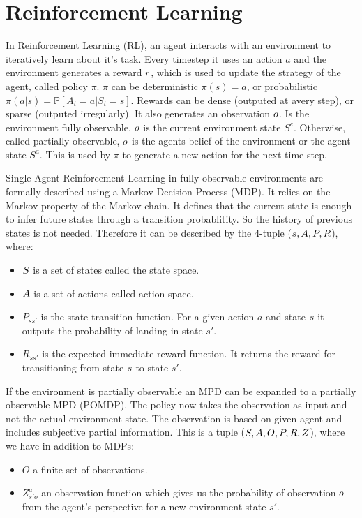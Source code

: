 \section{Reinforcement Learning}
In Reinforcement Learning (RL), an agent interacts with an environment to iteratively learn about it's task. Every timestep it uses an action $a$ and the environment generates a reward $r$, which is used to update the strategy of the agent, called policy $\pi$. $\pi$ can be deterministic $\pi(s) = a$, or probabilistic $\pi(a|s) = \mathbb{P}[A_t=a|S_t=s]$. Rewards can be dense (outputed at avery step), or sparse (outputed irregularly). It also generates an observation $o$. Is the environment fully observable, $o$ is the current environment state $S^e$. Otherwise, called partially observable, $o$ is the agents belief of the environment or the agent state $S^a$. This is used by $\pi$ to generate a new action for the next time-step. \par

Single-Agent Reinforcement Learning in fully observable environments are formally described using a Markov Decision Process (MDP). It relies on the Markov property of the Markov chain. It defines that the current state is enough to infer future states through a transition probablitity. So the history of previous states is not needed. Therefore it can be described by the 4-tuple ($s, A, P, R$), where:
\begin{itemize}[noitemsep,nolistsep]
	\item $S$ is a set of states called the state space.
	\item $A$ is a set of actions called action space.
	\item $P_{ss'}$ is the state transition function. For a given action $a$ and state $s$ it outputs the probability of landing in state $s'$.
	\item $R_{ss'}$ is the expected immediate reward function. It returns the reward for transitioning from state $s$ to state $s'$.
\end{itemize}

If the environment is partially observable an MPD can be expanded to a partially observable MPD (POMDP). The policy now takes the observation as input and not the actual environment state. The observation is based on given agent and includes subjective partial information. This is a tuple ($S, A, O, P, R, Z$), where we have in addition to MDPs:
\begin{itemize}[noitemsep,nolistsep]
	\item $O$ a finite set of observations.
	\item $Z_{s'o}^a$ an observation function which gives us the probability of observation $o$ from the agent's perspective for a new environment state $s'$.
\end{itemize}

